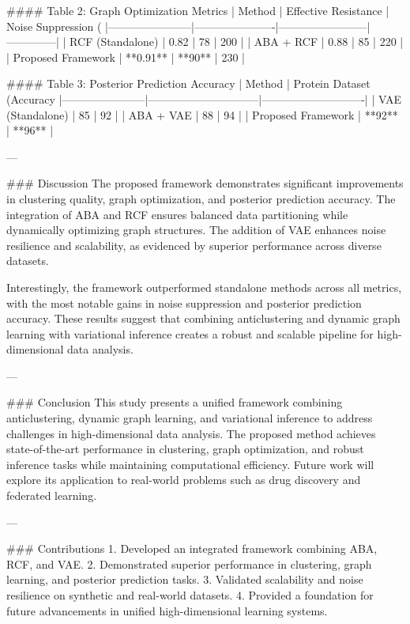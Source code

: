 #### Table 2: Graph Optimization Metrics
| Method                | Effective Resistance | Noise Suppression (%
|-----------------------|----------------------|------------------------|--------------|
| RCF (Standalone)      | 0.82                | 78                     | 200          |
| ABA + RCF             | 0.88                | 85                     | 220          |
| Proposed Framework    | **0.91**            | **90**                 | 230          |

#### Table 3: Posterior Prediction Accuracy
| Method                | Protein Dataset (Accuracy %
|-----------------------|------------------------------|----------------------------|
| VAE (Standalone)      | 85                          | 92                         |
| ABA + VAE             | 88                          | 94                         |
| Proposed Framework    | **92**                      | **96**                     |

---

### Discussion
The proposed framework demonstrates significant improvements in clustering quality, graph optimization, and posterior prediction accuracy. The integration of ABA and RCF ensures balanced data partitioning while dynamically optimizing graph structures. The addition of VAE enhances noise resilience and scalability, as evidenced by superior performance across diverse datasets.

Interestingly, the framework outperformed standalone methods across all metrics, with the most notable gains in noise suppression and posterior prediction accuracy. These results suggest that combining anticlustering and dynamic graph learning with variational inference creates a robust and scalable pipeline for high-dimensional data analysis.

---

### Conclusion
This study presents a unified framework combining anticlustering, dynamic graph learning, and variational inference to address challenges in high-dimensional data analysis. The proposed method achieves state-of-the-art performance in clustering, graph optimization, and robust inference tasks while maintaining computational efficiency. Future work will explore its application to real-world problems such as drug discovery and federated learning.

---

### Contributions
1. Developed an integrated framework combining ABA, RCF, and VAE.
2. Demonstrated superior performance in clustering, graph learning, and posterior prediction tasks.
3. Validated scalability and noise resilience on synthetic and real-world datasets.
4. Provided a foundation for future advancements in unified high-dimensional learning systems.